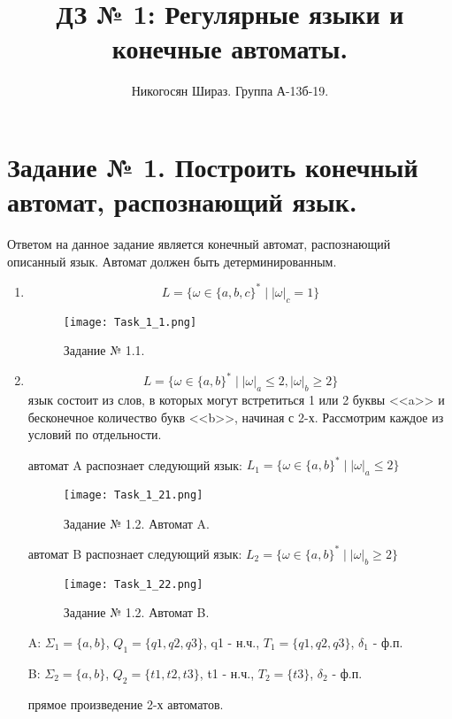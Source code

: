 \documentclass[a4paper, 12pt]{article}
\title{ДЗ № 1: Регулярные языки и конечные автоматы.}
\author{Никогосян Шираз. Группа А-13б-19.}
\date{}
\begin{document}
\maketitle

\newpage

\section{Задание № 1.  Построить конечный автомат, распознающий язык.}

Ответом на данное задание является конечный автомат, распознающий описанный язык. Автомат должен быть детерминированным.

\begin{enumerate}

\item$$ L = \{\omega \in \{a, b, c\}^* \mid  |\omega|_c = 1 \} $$
\begin{figure}[!h]
\centering
\texttt{[image: Task\_1\_1.png]}
\caption{Задание № 1.1.}
\end{figure}

\item$$ L = \{\omega \in \{a, b\}^* \mid |\omega|_a \leq 2,|\omega|_b \geq 2 \} $$
 язык состоит из слов, в которых могут встретиться 1 или 2 буквы <<a>> и бесконечное количество букв <<b>>, начиная с 2-х. Рассмотрим каждое из условий по отдельности.

 автомат A распознает следующий язык: $ L_1 = \{\omega \in \{a, b\}^* \mid |\omega|_a \leq 2 \} $
\begin{figure}[h!]
\centering
\texttt{[image: Task\_1\_21.png]}
\caption{Задание № 1.2. Автомат A.}
\end{figure}

 автомат B распознает следующий язык: $ L_2 = \{\omega \in \{a, b\}^* \mid |\omega|_b \geq 2 \} $
\begin{figure}[!h]
\centering
\texttt{[image: Task\_1\_22.png]}
\caption{Задание № 1.2. Автомат B.}
\end{figure}

 A: $ \Sigma_1 = \{a, b\}$, $ Q_1 = \{q1, q2, q3 \} $, q1 - н.ч., $ T_1 = \{q1, q2, q3 \} $, $ \delta_1 $ - ф.п.

 B: $ \Sigma_2 = \{a, b\}$, $ Q_2 = \{t1, t2, t3 \} $, t1 - н.ч., $ T_2 = \{t3 \} $, $ \delta_2 $ - ф.п.

 прямое произведение 2-х автоматов.


\end{enumerate}
\end{document}
